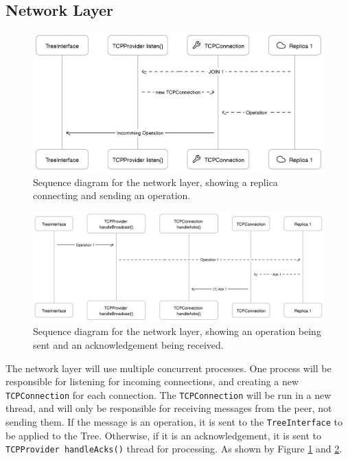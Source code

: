 \documentclass[12pt]{report}
\begin{document}
\subsection{Network Layer}

\begin{figure}[h]
    \centering
    \includegraphics[width=1\textwidth]{images/networkjoin.png}
    \caption{Sequence diagram for the network layer, showing a replica connecting and sending an operation.}
    \label{fig:networkjoin}
\end{figure} 

\begin{figure}[h]
    \centering
    \includegraphics[width=1\textwidth]{images/networksend.png}
    \caption{Sequence diagram for the network layer, showing an operation being sent and an acknowledgement being received.}
    \label{fig:networksend}
\end{figure} 

The network layer will use multiple concurrent processes. One process will be responsible for listening for incoming connections, and creating a new \texttt{TCPConnection} for each connection. The \texttt{TCPConnection} will be run in a new thread, and will only be responsible for receiving messages from the peer, not sending them. If the message is an operation, it is sent to the \texttt{TreeInterface} to be applied to the Tree. Otherwise, if it is an acknowledgement, it is sent to \texttt{TCPProvider handleAcks()} thread for processing. As shown by Figure \ref{fig:networkjoin} and \ref{fig:networksend}. \par
\end{document}
